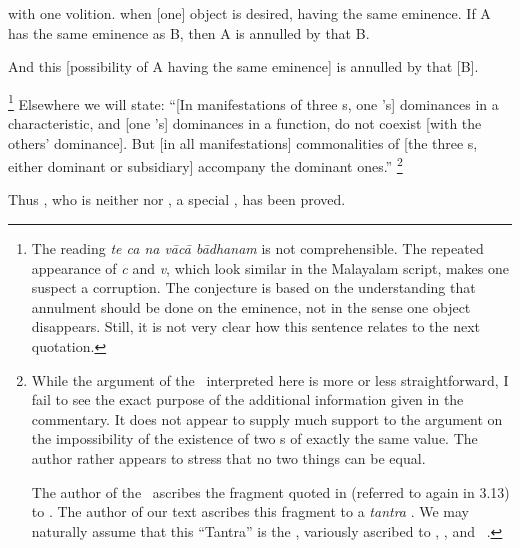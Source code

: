  with one volition.   when [one] object is desired,  having the same eminence.  If A has the same eminence as B, then A is annulled by that B\@.  \begin{uncertain}And this [possibility of A having the same eminence] is annulled by that [B]\@.\end{uncertain}%
\footnote{The reading \emph{te ca na vācā bādhanam} is not comprehensible.  The repeated appearance of \emph{c} and \emph{v}, which look similar in the Malayalam script, makes one suspect a corruption.  The conjecture is based on the understanding that annulment should be done on the eminence, not in the sense one object disappears.  Still, it is not very clear how this sentence relates to the next quotation.%
}  Elsewhere we will state: ``[In manifestations of three \guna s, one \guna's] dominances in a characteristic, and [one \guna's] dominances in a function, do not coexist [with the others' dominance].  But [in all manifestations] commonalities of [the three \guna s, either dominant or subsidiary] accompany the dominant ones.''%
\footnote{While the argument of the \bhasya\ interpreted here is more or less straightforward, I fail to see the exact purpose of the additional information given in the commentary.  It does not appear to supply much support to the argument on the impossibility of the existence of two \aisvarya s of exactly the same value.  The author rather appears to stress that no two things can be equal.%

	The author of the \YD\ ascribes the fragment quoted in  (referred to again in 3.13) to \Varsaganya.  The author of our text ascribes this fragment to a \emph{tantra} \citep[167]{yvi}.  We may naturally assume that this ``Tantra'' is the \Sastitantra, variously ascribed to \Kapila, \Pancasikha, and \Varsaganya\ \citep[127]{eoip:samkhya}.}%

  Thus \Isvara, who is neither \pradhana\/ nor \purusa, a special \purusa, has been proved.

